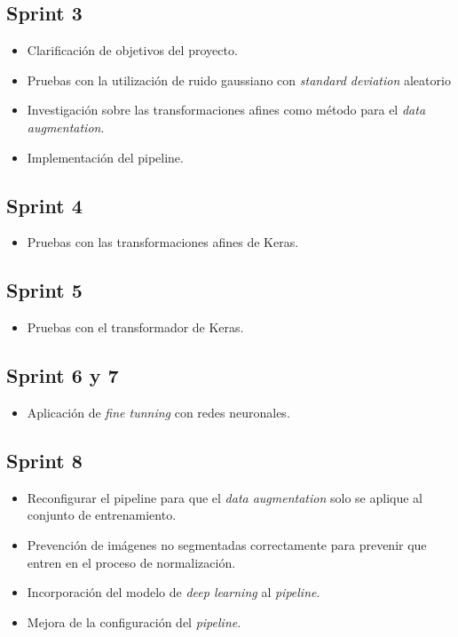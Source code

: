 \subsection{Sprint 3}

\begin{itemize}
\item Clarificación de objetivos del proyecto.
\item Pruebas con la utilización de ruido gaussiano con \textit{standard deviation} aleatorio
\item Investigación sobre las transformaciones afines como método para el \textit{data augmentation}.
\item Implementación del pipeline.
\end{itemize}

\subsection{Sprint 4}

\begin{itemize}
\item Pruebas con las transformaciones afines de Keras.
\end{itemize}

\subsection{Sprint 5}

\begin{itemize}
\item Pruebas con el transformador de Keras.
\end{itemize}

\subsection{Sprint 6 y 7}

\begin{itemize}
\item Aplicación de \textit{fine tunning} con redes neuronales.
\end{itemize}

\subsection{Sprint 8}

\begin{itemize}
\item Reconfigurar el pipeline para que el \textit{data augmentation} solo se aplique al conjunto de entrenamiento.
\item Prevención de imágenes no segmentadas correctamente para prevenir que entren en el proceso de normalización.
\item Incorporación del modelo de \textit{deep learning} al \textit{pipeline}.
\item Mejora de la configuración del \textit{pipeline}.
\end{itemize}

